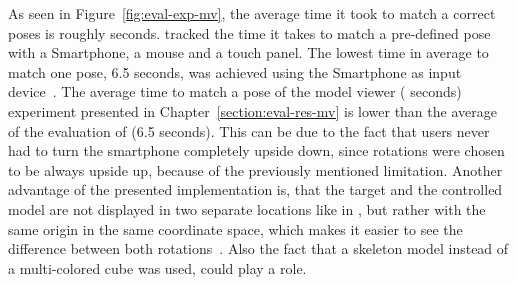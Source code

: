 As seen in Figure~\ref{fig:eval-exp-mv}, the average time it took to match a correct poses is roughly \evalExpMvAvgPoses{} seconds. \citeauthor{Katzakis.2010} tracked the time it takes to match a pre-defined pose with a Smartphone, a mouse and a touch panel. The lowest time in average to match one pose, 6.5 seconds, was achieved using the Smartphone as input device~\cite[140]{Katzakis.2010}. The average time to match a pose of the model viewer (\evalExpMvAvgPoses{} seconds) experiment presented in Chapter~\ref{section:eval-res-mv} is lower than the average of the evaluation of \citeauthor{Katzakis.2010} (6.5 seconds). This can be due to the fact that users never had to turn the smartphone completely upside down, since rotations were chosen to be always upside up, because of the previously mentioned limitation. Another advantage of the presented implementation is, that the target and the controlled model are not displayed in two separate locations like in {}, but rather with the same origin in the same coordinate space, which makes it easier to see the difference between both rotations~\cite[140]{Katzakis.2010}. Also the fact that a skeleton model instead of a multi-colored cube was used, could play a role. 

